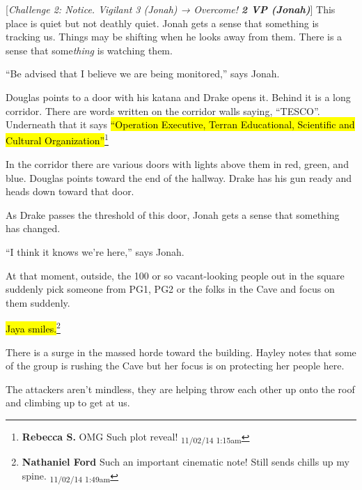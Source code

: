 {[}\textit{Challenge 2: Notice.  Vigilant 3 (Jonah) → Overcome! }\textit{\textbf{2 VP (Jonah)}}{]}  This place is quiet but not deathly quiet.  Jonah gets a sense that something is tracking us.  Things may be shifting when he looks away from them.  There is a sense that some\textit{thing} is watching them.

``Be advised that I believe we are being monitored,'' says Jonah.

Douglas points to a door with his katana and Drake opens it.  Behind it is a long corridor.  There are words written on the corridor walls saying, ``TESCO''.  Underneath that it says \hl{``Operation Executive, Terran Educational, Scientific and Cultural Organization''}\footnote{\textbf{Rebecca S. }OMG
Such plot reveal! \textsubscript{11/02/14 1:15am}}

In the corridor there are various doors with lights above them in red, green, and blue. Douglas points toward the end of the hallway.  Drake has his gun ready and heads down toward that door.

As Drake passes the threshold of this door, Jonah gets a sense that something has changed.

``I think it knows we're here,'' says Jonah.





At that moment, outside, the 100 or so vacant-looking people out in the square suddenly pick someone from PG1, PG2 or the folks in the Cave and focus on them suddenly.



\hl{Jaya smiles.}\footnote{\textbf{Nathaniel Ford }Such an important cinematic note! Still sends chills up my spine. \textsubscript{11/02/14 1:49am}}



There is a surge in the massed horde toward the building.  Hayley notes that some of the group is rushing the Cave but her focus is on protecting her people here.

The attackers aren't mindless, they are helping throw each other up onto the roof and climbing up to get at us.

